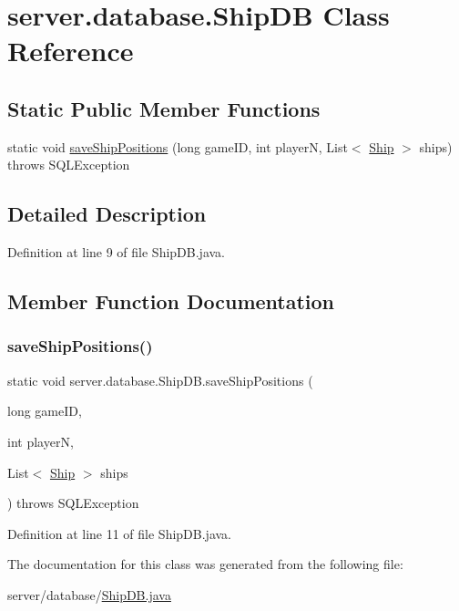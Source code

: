 \hypertarget{classserver_1_1database_1_1_ship_d_b}{}\section{server.\+database.\+Ship\+DB Class Reference}
\label{classserver_1_1database_1_1_ship_d_b}
\subsection*{Static Public Member Functions}
\begin{DoxyCompactItemize}
\item 
static void \hyperlink{classserver_1_1database_1_1_ship_d_b_a92c5ec48a975c937cb08275e9bfbb62e}{save\+Ship\+Positions} (long game\+ID, int playerN, List$<$ \hyperlink{classserver_1_1logic_1_1game_1_1_ship}{Ship} $>$ ships)  throws S\+Q\+L\+Exception 
\end{DoxyCompactItemize}


\subsection{Detailed Description}


Definition at line 9 of file Ship\+D\+B.\+java.



\subsection{Member Function Documentation}
\hypertarget{classserver_1_1database_1_1_ship_d_b_a92c5ec48a975c937cb08275e9bfbb62e}{}\label{classserver_1_1database_1_1_ship_d_b_a92c5ec48a975c937cb08275e9bfbb62e} 
\subsubsection{\texorpdfstring{save\+Ship\+Positions()}{saveShipPositions()}}
{\footnotesize\ttfamily static void server.\+database.\+Ship\+D\+B.\+save\+Ship\+Positions (\begin{DoxyParamCaption}\item[{long}]{game\+ID,  }\item[{int}]{playerN,  }\item[{List$<$ \hyperlink{classserver_1_1logic_1_1game_1_1_ship}{Ship} $>$}]{ships }\end{DoxyParamCaption}) throws S\+Q\+L\+Exception\hspace{0.3cm}{\ttfamily [static]}}



Definition at line 11 of file Ship\+D\+B.\+java.



The documentation for this class was generated from the following file\+:\begin{DoxyCompactItemize}
\item 
server/database/\hyperlink{_ship_d_b_8java}{Ship\+D\+B.\+java}\end{DoxyCompactItemize}

